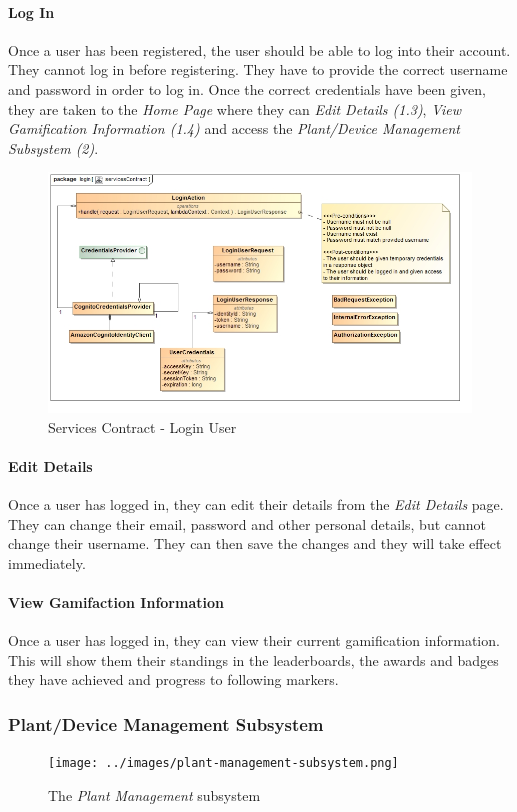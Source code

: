 \documentclass{article}
\let\cleardoublepage\clearpage
\begin{document}
		\paragraph{Log In}
			Once a user has been registered, the user should be able to log into their account. They cannot log in before registering. They have to provide the correct username and password in order to log in. Once the correct credentials have been given, they are taken to the \emph{Home Page} where they can \emph{Edit Details (1.3)}, \emph{View Gamification Information (1.4)} and access the \emph{Plant/Device Management Subsystem (2)}.
			\begin{figure}[H]
				\includegraphics[width=\linewidth]{../images/ServicesContracts/login.jpg}
				\caption{Services Contract - Login User}
			\end{figure}
		\paragraph{Edit Details}
			Once a user has logged in, they can edit their details from the \emph{Edit Details} page. They can change their email, password and other personal details, but cannot change their username. They can then save the changes and they will take effect immediately.
		\paragraph{View Gamifaction Information}
			Once a user has logged in, they can view their current gamification information. This will show them their standings in the leaderboards, the awards and badges they have achieved and progress to following markers.			
	
\cleardoublepage
		\subsubsection{Plant/Device Management Subsystem}
			\begin{figure}[H]
				\centering
				\texttt{[image: ../images/plant-management-subsystem.png]}
				\caption{The \emph{Plant Management} subsystem}
			\end{figure}
\end{document}
